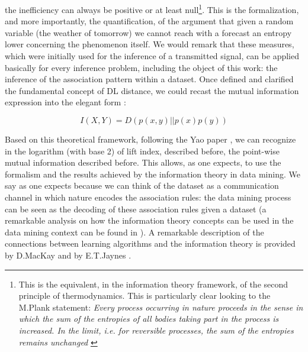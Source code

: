 \documentclass[12pt,%
               a4paper,%
               oneside,openany,%
               titlepage,%
               headinclude,footinclude,%
               BCOR5mm,%
               cleardoublepage=empty,%
               tablecaptionabove,%
               floatperchapter,
               ]{scrreprt}                 %
\begin{document}
the inefficiency can always be positive or at least null\footnote{This is the equivalent, in the information theory framework, of the second principle of thermodynamics. This is particularly clear looking to the M.Plank statement: \textit{Every process occurring in nature proceeds in the sense in which the sum of the entropies of all bodies taking part in the process is increased. In the limit, i.e. for reversible processes, the sum of the entropies remains unchanged} \cite{planck1900theory}}. This is the formalization, and more importantly, the quantification, of the argument that given a random variable (the weather of tomorrow) we cannot reach with a forecast an entropy lower concerning the phenomenon itself. We would remark that these measures, which were initially used for the inference of a transmitted signal, can be applied basically for every inference problem, including the object of this work: the inference of the association pattern within a dataset. Once defined and clarified the fundamental concept of DL distance, we could recast the mutual information expression into the elegant form \cite{mackay2003information}:

\begin{equation}
I(X,Y)=D(p(x,y)||p(x)p(y))
\end{equation}

Based on this theoretical framework, following the Yao paper \cite{yao2003information}, we can recognize in the logarithm (with base 2) of lift index, described before, the point-wise mutual information described before. This allows, as one expects, to use the formalism and the results achieved by the information theory in data mining. We say as one expects because we can think of the dataset as a communication channel in which nature encodes the association rules: the data mining process can be seen as the decoding of these association rules given a dataset (a remarkable analysis on how the information theory concepts can be used in the data mining context can be found in \cite{zaki2014data}). A remarkable description of the connections between learning algorithms and the information theory is provided by D.MacKay \cite{mackay2003information} and by E.T.Jaynes \cite{jaynes2003probability} .
\end{document}
